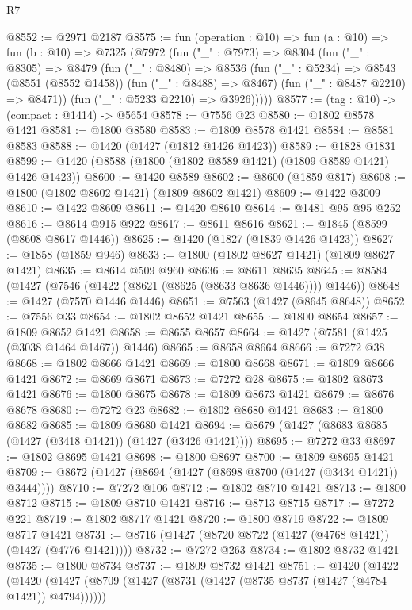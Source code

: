 \begin{lexlean}{R7}
\begin{coremodule}
@8552 := @2971 @2187
@8575 := fun (operation : @10) =>
  fun (a : @10) =>
  fun (b : @10) =>
  @7325
    (@7972
      (fun ("_" : @7973) =>
      @8304
        (fun ("_" : @8305) =>
        @8479
          (fun ("_" : @8480) =>
          @8536
            (fun ("_" : @5234) =>
            @8543
              (@8551 (@8552 @1458))
              (fun ("_" : @8488) => @8467)
              (fun ("_" : @8487 @2210) => @8471))
            (fun ("_" : @5233 @2210) => @3926)))))
@8577 := (tag : @10) -> (compact : @1414) -> @5654
@8578 := @7556 @23
@8580 := @1802 @8578 @1421
@8581 := @1800 @8580
@8583 := @1809 @8578 @1421
@8584 := @8581 @8583
@8588 := @1420 (@1427 (@1812 @1426 @1423))
@8589 := @1828 @1831
@8599 := @1420 (@8588 (@1800 (@1802 @8589 @1421) (@1809 @8589 @1421) @1426 @1423))
@8600 := @1420 @8589
@8602 := @8600 (@1859 @817)
@8608 := @1800 (@1802 @8602 @1421) (@1809 @8602 @1421)
@8609 := @1422 @3009
@8610 := @1422 @8609
@8611 := @1420 @8610
@8614 := @1481 @95 @95 @252
@8616 := @8614 @915 @922
@8617 := @8611 @8616
@8621 := @1845 (@8599 (@8608 @8617 @1446))
@8625 := @1420 (@1827 (@1839 @1426 @1423))
@8627 := @1858 (@1859 @946)
@8633 := @1800 (@1802 @8627 @1421) (@1809 @8627 @1421)
@8635 := @8614 @509 @960
@8636 := @8611 @8635
@8645 := @8584 (@1427 (@7546 (@1422 (@8621 (@8625 (@8633 @8636 @1446)))) @1446))
@8648 := @1427 (@7570 @1446 @1446)
@8651 := @7563 (@1427 (@8645 @8648))
@8652 := @7556 @33
@8654 := @1802 @8652 @1421
@8655 := @1800 @8654
@8657 := @1809 @8652 @1421
@8658 := @8655 @8657
@8664 := @1427 (@7581 (@1425 (@3038 @1464 @1467)) @1446)
@8665 := @8658 @8664
@8666 := @7272 @38
@8668 := @1802 @8666 @1421
@8669 := @1800 @8668
@8671 := @1809 @8666 @1421
@8672 := @8669 @8671
@8673 := @7272 @28
@8675 := @1802 @8673 @1421
@8676 := @1800 @8675
@8678 := @1809 @8673 @1421
@8679 := @8676 @8678
@8680 := @7272 @23
@8682 := @1802 @8680 @1421
@8683 := @1800 @8682
@8685 := @1809 @8680 @1421
@8694 := @8679 (@1427 (@8683 @8685 (@1427 (@3418 @1421)) (@1427 (@3426 @1421))))
@8695 := @7272 @33
@8697 := @1802 @8695 @1421
@8698 := @1800 @8697
@8700 := @1809 @8695 @1421
@8709 := @8672 (@1427 (@8694 (@1427 (@8698 @8700 (@1427 (@3434 @1421)) @3444))))
@8710 := @7272 @106
@8712 := @1802 @8710 @1421
@8713 := @1800 @8712
@8715 := @1809 @8710 @1421
@8716 := @8713 @8715
@8717 := @7272 @221
@8719 := @1802 @8717 @1421
@8720 := @1800 @8719
@8722 := @1809 @8717 @1421
@8731 := @8716 (@1427 (@8720 @8722 (@1427 (@4768 @1421)) (@1427 (@4776 @1421))))
@8732 := @7272 @263
@8734 := @1802 @8732 @1421
@8735 := @1800 @8734
@8737 := @1809 @8732 @1421
@8751 := @1420
    (@1422
      (@1420
        (@1427 (@8709 (@1427 (@8731 (@1427 (@8735 @8737 (@1427 (@4784 @1421)) @4794))))))

\end{coremodule}
\end{lexlean}
